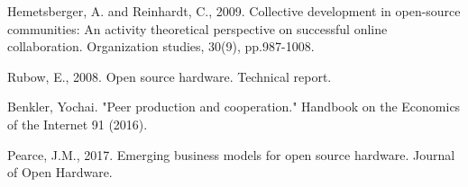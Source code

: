 Hemetsberger, A. and Reinhardt, C., 2009. Collective development in open-source communities: An activity theoretical perspective on successful online collaboration. Organization studies, 30(9), pp.987-1008.


Rubow, E., 2008. Open source hardware. Technical report.

Benkler, Yochai. "Peer production and cooperation." Handbook on the Economics of the Internet 91 (2016).

Pearce, J.M., 2017. Emerging business models for open source hardware. Journal of Open Hardware.
